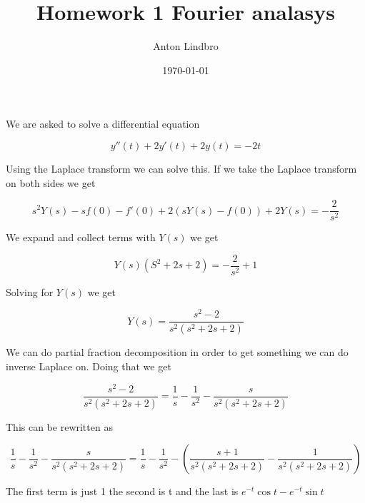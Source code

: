 \documentclass[a4paper]{article}
\title{Homework 1 Fourier analasys}
\author{Anton Lindbro}
\date{\today}
\begin{document}
\maketitle
\maketitle

\section{}

We are asked to solve a differential equation

\begin{equation}
    y''(t) + 2y'(t) + 2y(t) = -2t
\end{equation}

Using the Laplace transform we can solve this. If we take the Laplace transform on  both sides we get

\begin{equation}
    s^2Y(s) - sf(0) - f'(0) + 2(sY(s)-f(0)) + 2Y(s) = -\frac{2}{s^2}
\end{equation}

We expand and collect terms with $Y(s)$ we get

\begin{equation}
    Y(s)(S^2+2s+2) = -\frac{2}{s^2} + 1
\end{equation}

Solving for $Y(s)$ we get

\begin{equation}
    Y(s) = \frac{s^2 - 2}{s^2(s^2+2s+2)}
\end{equation}

We can do partial fraction decomposition in order to get something we can do inverse Laplace on. Doing that we get

\begin{equation}
    \frac{s^2 - 2}{s^2(s^2+2s+2)} = \frac{1}{s} - \frac{1}{s^2}  - \frac{s}{s^2(s^2+2s+2)}
\end{equation}

This can be rewritten as

\begin{equation}
    \frac{1}{s} - \frac{1}{s^2}  - \frac{s}{s^2(s^2+2s+2)} = \frac{1}{s} - \frac{1}{s^2}  - (\frac{s+1}{s^2(s^2+2s+2)} - \frac{1}{s^2(s^2+2s+2)})
\end{equation}

The first term is just 1 the second is t and the last is $e^{-t}\cos{t} - e^{-t}\sin{t}$
\end{document}
